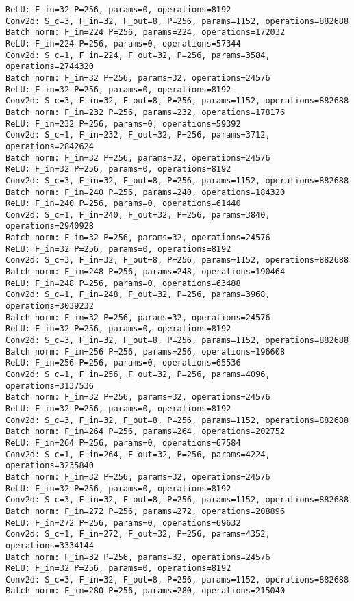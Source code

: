 \begin{Verbatim}[fontsize=\small]
ReLU: F_in=32 P=256, params=0, operations=8192
Conv2d: S_c=3, F_in=32, F_out=8, P=256, params=1152, operations=882688
Batch norm: F_in=224 P=256, params=224, operations=172032
ReLU: F_in=224 P=256, params=0, operations=57344
Conv2d: S_c=1, F_in=224, F_out=32, P=256, params=3584, operations=2744320
Batch norm: F_in=32 P=256, params=32, operations=24576
ReLU: F_in=32 P=256, params=0, operations=8192
Conv2d: S_c=3, F_in=32, F_out=8, P=256, params=1152, operations=882688
Batch norm: F_in=232 P=256, params=232, operations=178176
ReLU: F_in=232 P=256, params=0, operations=59392
Conv2d: S_c=1, F_in=232, F_out=32, P=256, params=3712, operations=2842624
Batch norm: F_in=32 P=256, params=32, operations=24576
ReLU: F_in=32 P=256, params=0, operations=8192
Conv2d: S_c=3, F_in=32, F_out=8, P=256, params=1152, operations=882688
Batch norm: F_in=240 P=256, params=240, operations=184320
ReLU: F_in=240 P=256, params=0, operations=61440
Conv2d: S_c=1, F_in=240, F_out=32, P=256, params=3840, operations=2940928
Batch norm: F_in=32 P=256, params=32, operations=24576
ReLU: F_in=32 P=256, params=0, operations=8192
Conv2d: S_c=3, F_in=32, F_out=8, P=256, params=1152, operations=882688
Batch norm: F_in=248 P=256, params=248, operations=190464
ReLU: F_in=248 P=256, params=0, operations=63488
Conv2d: S_c=1, F_in=248, F_out=32, P=256, params=3968, operations=3039232
Batch norm: F_in=32 P=256, params=32, operations=24576
ReLU: F_in=32 P=256, params=0, operations=8192
Conv2d: S_c=3, F_in=32, F_out=8, P=256, params=1152, operations=882688
Batch norm: F_in=256 P=256, params=256, operations=196608
ReLU: F_in=256 P=256, params=0, operations=65536
Conv2d: S_c=1, F_in=256, F_out=32, P=256, params=4096, operations=3137536
Batch norm: F_in=32 P=256, params=32, operations=24576
ReLU: F_in=32 P=256, params=0, operations=8192
Conv2d: S_c=3, F_in=32, F_out=8, P=256, params=1152, operations=882688
Batch norm: F_in=264 P=256, params=264, operations=202752
ReLU: F_in=264 P=256, params=0, operations=67584
Conv2d: S_c=1, F_in=264, F_out=32, P=256, params=4224, operations=3235840
Batch norm: F_in=32 P=256, params=32, operations=24576
ReLU: F_in=32 P=256, params=0, operations=8192
Conv2d: S_c=3, F_in=32, F_out=8, P=256, params=1152, operations=882688
Batch norm: F_in=272 P=256, params=272, operations=208896
ReLU: F_in=272 P=256, params=0, operations=69632
Conv2d: S_c=1, F_in=272, F_out=32, P=256, params=4352, operations=3334144
Batch norm: F_in=32 P=256, params=32, operations=24576
ReLU: F_in=32 P=256, params=0, operations=8192
Conv2d: S_c=3, F_in=32, F_out=8, P=256, params=1152, operations=882688
Batch norm: F_in=280 P=256, params=280, operations=215040

\end{Verbatim}
